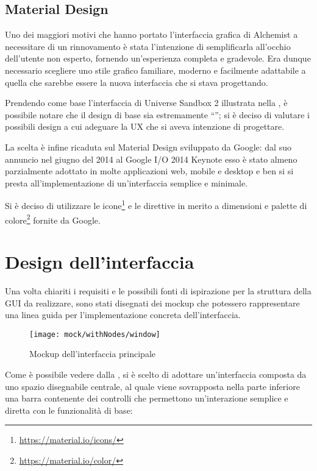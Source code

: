         \subsection{Material Design}\label{subsec:material}
            Uno dei maggiori motivi che hanno portato l'interfaccia grafica di Alchemist a necessitare di un rinnovamento è stata l'intenzione di semplificarla all'occhio dell'utente non esperto, fornendo un'esperienza completa e gradevole.
            Era dunque necessario scegliere uno stile grafico familiare, moderno e facilmente adattabile a quella che sarebbe essere la nuova interfaccia che si stava progettando.

            Prendendo come base l'interfaccia di Universe Sandbox 2 illustrata nella , è possibile notare che il design di base sia estremamente ``'';
            si è deciso di valutare i possibili design a cui adeguare la UX che si aveva intenzione di progettare.

            La scelta è infine ricaduta sul Material Design sviluppato da Google:
            dal suo annuncio nel giugno del 2014 al Google I/O 2014 Keynote esso è stato almeno parzialmente adottato in molte applicazioni web, mobile e desktop e ben si si presta all'implementazione di un'interfaccia semplice e minimale.

            Si è deciso di utilizzare le icone\footnote{\url{https://material.io/icons/}} e le direttive in merito a dimensioni e palette di colore\footnote{\url{https://material.io/color/}} fornite da Google.

    \section{Design dell'interfaccia}\label{sec:design}
        Una volta chiariti i requisiti e le possibili fonti di ispirazione per la struttura della GUI da realizzare, sono stati disegnati dei mockup che potessero rappresentare una linea guida per l'implementazione concreta dell'interfaccia.

        \begin{figure}[htbp]
            \centering
            \texttt{[image: mock/withNodes/window]}
            \caption{Mockup dell'interfaccia principale}
            \label{fig:mock:mainWindow}
        \end{figure}

        Come è possibile vedere dalla , si è scelto di adottare un'interfaccia composta da uno spazio disegnabile centrale, al quale viene sovrapposta nella parte inferiore una barra contenente dei controlli che permettono un'interazione semplice e diretta con le funzionalità di base:


